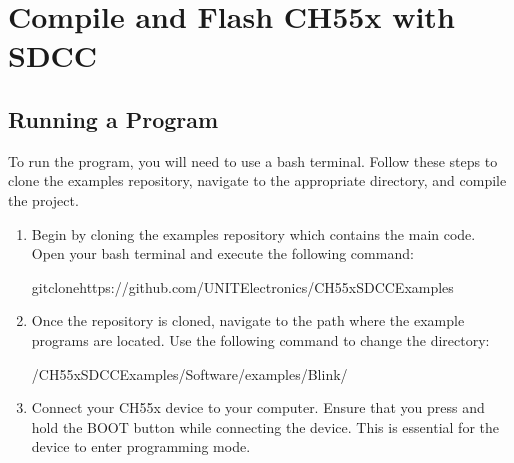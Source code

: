 \documentclass[letterpaper,10pt,english]{sphinxmanual}
\begin{document}
\sphinxstepscope


\chapter{Compile and Flash CH55x with SDCC}
\label{\detokenize{compile:compile-and-flash-ch55x-with-sdcc}}\label{\detokenize{compile::doc}}

\section{Running a Program}
\label{\detokenize{compile:running-a-program}}
\sphinxAtStartPar
To run the program, you will need to use a bash terminal. Follow these steps to clone the examples repository, navigate to the appropriate directory, and compile the project.
\begin{enumerate}
%
\item {} 
\sphinxAtStartPar
{}

\sphinxAtStartPar
Begin by cloning the examples repository which contains the main code. Open your bash terminal and execute the following command:

\begin{sphinxVerbatim}[commandchars=\\\{\}]
gitclonehttps://github.com/UNIT\PYGZhy{}Electronics/CH55x\PYGZus{}SDCC\PYGZus{}Examples
\end{sphinxVerbatim}

\item {} 
\sphinxAtStartPar
{}

\sphinxAtStartPar
Once the repository is cloned, navigate to the path where the example programs are located. Use the following command to change the directory:

\begin{sphinxVerbatim}[commandchars=\\\{\}]
\PYGZti{}/CH55x\PYGZus{}SDCC\PYGZus{}Examples/Software/examples/Blink/
\end{sphinxVerbatim}

\item {} 
\sphinxAtStartPar
{}

\sphinxAtStartPar
Connect your CH55x device to your computer. Ensure that you press and hold the BOOT button while connecting the device. This is essential for the device to enter programming mode.


\end{enumerate}
\end{document}
